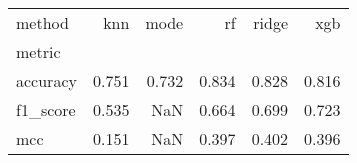 \begin{tabular}{lrrrrr}
\toprule
method & knn & mode & rf & ridge & xgb \\
metric &  &  &  &  &  \\
\midrule
accuracy & 0.751 & 0.732 & 0.834 & 0.828 & 0.816 \\
f1_score & 0.535 & NaN & 0.664 & 0.699 & 0.723 \\
mcc & 0.151 & NaN & 0.397 & 0.402 & 0.396 \\
\bottomrule
\end{tabular}
